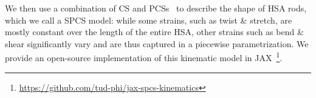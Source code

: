%
We then use a combination of \gls{CS} and \glspl{PCS}~\cite{renda2018discrete} to describe the shape of \gls{HSA} rods, which we call a \gls{SPCS} model: while some strains, such as twist \& stretch, are mostly constant over the length of the entire \gls{HSA}, other strains such as bend \& shear significantly vary and are thus captured in a piecewise parametrization. We provide an open-source implementation of this kinematic model in JAX~\footnote{\scriptsize \url{https://github.com/tud-phi/jax-spcs-kinematics}}.


